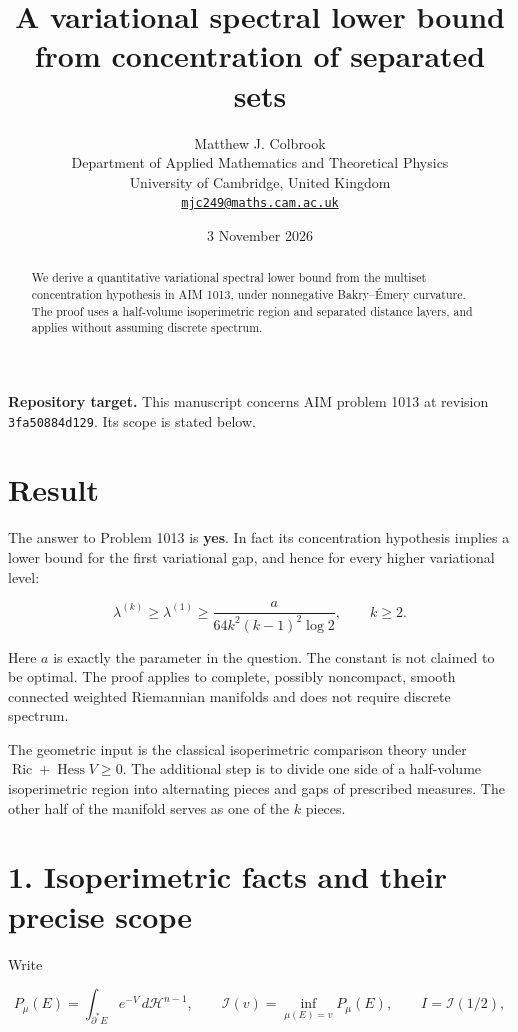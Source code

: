 \documentclass[11pt,a4paper]{article}
\title{\textbf{A variational spectral lower bound from concentration of separated sets}}
\author{Matthew J. Colbrook\\[3pt]
{\small Department of Applied Mathematics and Theoretical Physics}\\
{\small University of Cambridge, United Kingdom}\\
{\small\href{mailto:mjc249@maths.cam.ac.uk}{\texttt{mjc249@maths.cam.ac.uk}}}}
\date{3 November 2026}
\begin{document}
\maketitle
\begin{abstract}
We derive a quantitative variational spectral lower bound from the multiset concentration hypothesis in AIM 1013, under nonnegative Bakry--\'Emery curvature. The proof uses a half-volume isoperimetric region and separated distance layers, and applies without assuming discrete spectrum.
\end{abstract}
\noindent\textbf{Repository target.}
This manuscript concerns AIM problem 1013 at revision
\texttt{3fa50884d129}. Its scope is stated below.
\medskip

\hypertarget{1013-result}{%
\section{Result}\label{1013-result}}

The answer to Problem 1013 is \textbf{yes}. In fact its concentration
hypothesis implies a lower bound for the first variational gap, and
hence for every higher variational level:

\[
\boxed{
\lambda^{(k)}\geq\lambda^{(1)}
\geq \frac{a}{64k^2(k-1)^2\log 2},\qquad k\geq2.
}
\tag{1}
\]

Here \(a\) is exactly the parameter in the question. The constant is not
claimed to be optimal. The proof applies to complete, possibly
noncompact, smooth connected weighted Riemannian manifolds and does not
require discrete spectrum.

The geometric input is the classical isoperimetric comparison theory
under \(\operatorname{Ric}+\operatorname{Hess}V\geq0\). The additional
step is to divide one side of a half-volume isoperimetric region into
alternating pieces and gaps of prescribed measures. The other half of
the manifold serves as one of the \(k\) pieces.

\hypertarget{1013-isoperimetric-facts-and-their-precise-scope}{%
\section{1. Isoperimetric facts and their precise
scope}\label{1013-isoperimetric-facts-and-their-precise-scope}}

Write

\[
P_\mu(E)=\int_{\partial^*E}e^{-V}\,d\mathcal H^{n-1},
\qquad
\mathcal I(v)=\inf_{\mu(E)=v}P_\mu(E),
\qquad
I=\mathcal I(1/2),
\]
\end{document}
